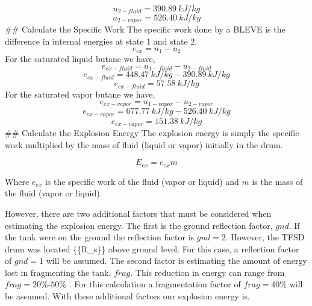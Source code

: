 \documentclass[10pt,parskip=half,
toc=sectionentrywithdots,
bibliography=totocnumbered,
captions=tableheading,numbers=noendperiod]{scrartcl}
\begin{document}
\begin{equation}u_{2-fluid} = 390.89\:kJ/kg\end{equation}
\begin{equation}u_{2-vapor} = 526.40\:kJ/kg\end{equation} \#\# Calculate
the Specific Work The specific work done by a BLEVE is the difference in
internal energies at state 1 and state 2,
\begin{equation}e_{ex}=u_1-u_2\end{equation} For the saturated liquid
butane we have,
\begin{equation}e_{ex-fluid} = u_{1-fluid} - u_{2-fluid}\end{equation}
\begin{equation}e_{ex-fluid} = 448.47\:kJ/kg - 390.89\:kJ/kg\end{equation}
\begin{equation}e_{ex-fluid} = 57.58\:kJ/kg\end{equation} For the
saturated vapor butane we have,
\begin{equation}e_{ex-vapor} = u_{1-vapor} - u_{2-vapor}\end{equation}
\begin{equation}e_{ex-vapor} = 677.77\:kJ/kg - 526.40\:kJ/kg\end{equation}
\begin{equation}e_{ex-vapor} = 151.38\:kJ/kg\end{equation} \#\#
Calculate the Explosion Energy The explosion energy is simply the
specific work multiplied by the mass of fluid (liquid or vapor)
initially in the drum.

\begin{equation}E_{ex}=e_{ex}m\end{equation}

Where \(e_{ex}\) is the specific work of the fluid (vapor or liquid) and
\(m\) is the mass of the fluid (vapor or liquid).

However, there are two additional factors that must be considered when
estimating the explosion energy. The first is the ground reflection
factor, \(gnd\). If the tank were on the ground the reflection factor is
\(gnd=2\). However, the TFSD drum was located \{\{R\_s\}\} above ground
level. For this case, a reflection factor of \(gnd=1\) will be assumed.
The second factor is estimating the amount of energy lost in fragmenting
the tank, \(frag\). This reduction in energy can range from
\(frag = 20\%\)-\(50\%\) \cite{Safety2010}. For this calculation a
fragmentation factor of \(frag=40\%\) will be assumed. With these
additional factors our explosion energy is,
\end{document}
